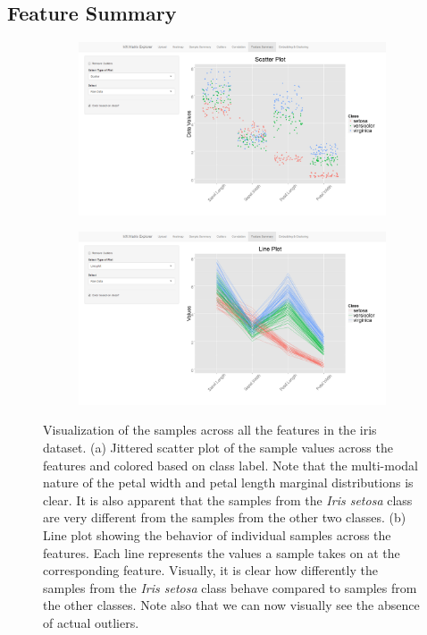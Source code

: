 \documentclass[12pt]{article}
\begin{document}
\subsection{Feature Summary}
\label{subsec:SubSecFeature}

\begin{figure}
	\centering
	\begin{subfigure}[b]{0.8\textwidth}
		\includegraphics[width=\textwidth]{Figures/Iris/ScatterColor_Raw.png}
		\subcaption{}
		\label{fig:FigScatter}
	\end{subfigure}
	\begin{subfigure}[b]{0.8\textwidth}
		\includegraphics[width=\textwidth]{Figures/Iris/LineColor_Raw.png}
		\subcaption{}
		\label{fig:FigLine}
	\end{subfigure}
	\caption{Visualization of the samples across all the features in the iris dataset. (a) Jittered scatter plot of the sample values across the features and colored based on class label. Note that the multi-modal nature of the petal width and petal length marginal distributions is clear. It is also apparent that the samples from the \textit{Iris setosa} class are very different from the samples from the other two classes. (b) Line plot showing the behavior of individual samples across the features. Each line represents the values a sample takes on at the corresponding feature. Visually, it is clear how differently the samples from the \textit{Iris setosa} class behave compared to samples from the other classes. Note also that we can now visually see the absence of actual outliers.}
	\label{fig:FigFeature}
\end{figure}
\end{document}
